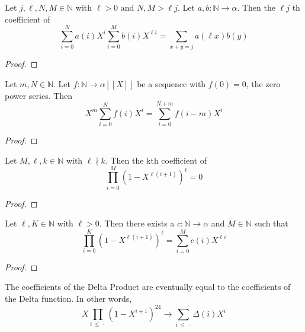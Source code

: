 \begin{lemma}
  \label{lem:coeff_sum_squash}
  \leanok
  Let $j, \ell, N, M \in \mathbb{N}$ with $\ell > 0$ and $N, M > \ell j$. 
  Let $a, b : \mathbb{N} \to \alpha$. Then the $\ell j$ th coefficient of
  \[ \sum_{i = 0}^{N} a (i) X ^ i \sum_{i = 0}^{M} b (i) X ^ {\ell i} = 
      \sum_{x + y = j} a (\ell x) b (y) \] 
\end{lemma}
\begin{proof}
  \leanok
\end{proof}


\begin{lemma}
  \label{lem:coeff_mul_shift_of_zero}
  \leanok
  Let $m, N \in \mathbb{N}$. Let $f : \mathbb{N} \to \alpha [[X]]$ be a sequence 
  with $f(0) = 0$, the zero power series. Then
  \[ X ^ m \sum_{i = 0}^{N} f (i) X ^ i = \sum_{i = 0}^{N + m} f (i - m) X ^ i \]
\end{lemma}
\begin{proof}
  \leanok
\end{proof}


\begin{lemma}
  \label{lem:coeff_zero_of_ndvd}
  \leanok
  Let $M, \ell, k \in \mathbb{N}$ with $\ell \nmid k$. Then the kth coefficient of 
  \[ \prod_{i = 0}^{M} (1 - X ^ {\ell (i + 1)}) ^ \ell = 0 \]
\end{lemma}
\begin{proof}
  \leanok
\end{proof}

\begin{lemma}
  \label{lem:prod_eq_sum}
  \leanok
  Let $\ell, K \in \mathbb{N}$ with $\ell > 0$. Then there exists a  $c : \mathbb{N} \to \alpha$ 
  and $M \in \mathbb{N}$ such that 
  \[ \prod _{i = 0}^{K} (1 - X ^ {\ell (i + 1)}) ^ \ell = 
      \sum_{i = 0}^{M} c (i) X ^ {\ell i} \]
\end{lemma}
\begin{proof}
  \leanok
\end{proof}

\begin{theorem}
  \label{thm:DeltaProduct_eventually_sum}
  \leanok
  The coefficients of the Delta Product are eventually equal to the coefficients of the Delta function.
  In other words, 
  \[ X \prod_{i \, \le \: \cdot} (1 - X ^ {i + 1}) ^ {24} \longrightarrow 
    \sum_{i \, \le \: \cdot} \Delta (i) X ^ i \]
\end{theorem}

